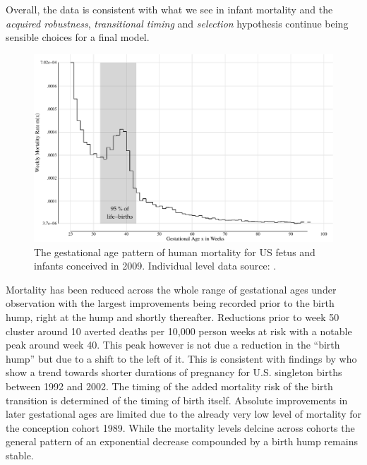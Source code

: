\documentclass[12pt, parskip=half]{scrartcl}
\begin{document}
Overall, the data is consistent with what we see in infant mortality and the \emph{acquired robustness}, \emph{transitional timing} and \emph{selection} hypothesis continue being sensible choices for a final model.

\begin{figure}[!htb]
  \centering
  \includegraphics[width = \textwidth]{./fig/us_fimort_2009_mx.pdf}
  \caption{The gestational age pattern of human mortality for US fetus and infants conceived in 2009. Individual level data source: \cite{DVS2015}.}
  \label{fig:us_fimort_2009_mx}
\end{figure}


Mortality has been reduced across the whole range of gestational ages under observation with the largest improvements being recorded prior to the birth hump, right at the hump and shortly thereafter. Reductions prior to week 50 cluster around 10 averted deaths per 10,000 person weeks at risk with a notable peak around week 40. This peak however is not due a reduction in the \enquote{birth hump} but due to a shift to the left of it. This is consistent with findings by \citeauthor{Davidoff2006} who show a trend towards shorter durations of pregnancy for U.S. singleton births between 1992 and 2002. The timing of the added mortality risk of the birth transition is determined of the timing of birth itself. Absolute improvements in later gestational ages are limited due to the already very low level of mortality for the conception cohort 1989. While the mortality levels delcine across cohorts the general pattern of an exponential decrease compounded by a birth hump remains stable.
\end{document}
